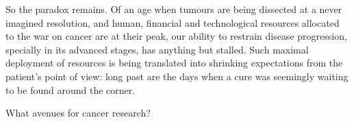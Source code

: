 


\bigskip{}






\medskip{}

So the paradox remains.  Of an age when tumours are being dissected at a never
imagined resolution, and human, financial and technological resources allocated
to the war on cancer are at their peak, our ability to restrain disease
progression, specially in its advanced stages, has anything but stalled.  Such
maximal deployment of resources is being translated into shrinking expectations
from the patient's point of view: long past are the days when a cure was
seemingly waiting to be found around the corner.

What avenues for cancer research?

\clearpage




